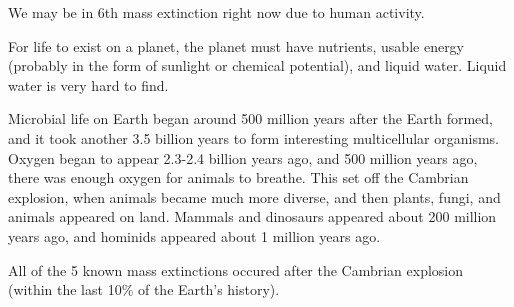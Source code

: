 \documentclass[class=article, crop=false]{standalone}
\begin{document}
\par
We may be in 6th mass extinction right now due to human activity.
\bigskip
\par
For life to exist on a planet, the planet must have nutrients, usable energy (probably in the form of sunlight or chemical potential), and liquid water. Liquid water is very hard to find.
\par
Microbial life on Earth began around 500 million years after the Earth formed, and it took another 3.5 billion years to form interesting multicellular organisms. Oxygen began to appear 2.3-2.4 billion years ago, and 500 million years ago, there was enough oxygen for animals to breathe. This set off the Cambrian explosion, when animals became much more diverse, and then plants, fungi, and animals appeared on land. Mammals and dinosaurs appeared about 200 million years ago, and hominids appeared about 1 million years ago.
\par
All of the 5 known mass extinctions occured after the Cambrian explosion (within the last 10\% of the Earth's history).
\end{document}

